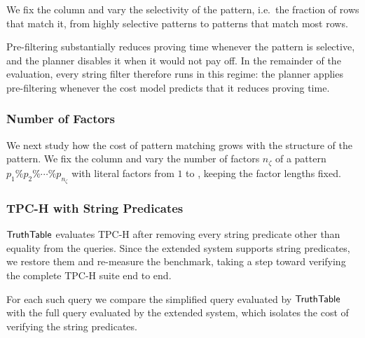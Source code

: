  We fix the column and vary the selectivity of the pattern, i.e.\ the fraction of rows that match it, from highly selective patterns to patterns that match most rows.

 

 Pre-filtering substantially reduces proving time whenever the pattern is selective, and the planner disables it when it would not pay off. In the remainder of the evaluation, every string filter therefore runs in this regime: the planner applies pre-filtering whenever the cost model predicts that it reduces proving time.

\subsubsection{Number of Factors}
\label{sec:eval-factors}

We next study how the cost of pattern matching grows with the structure of the pattern. We fix the column and vary the number of factors $n_\zeta$ of a pattern $p_1\%p_2\%\cdots\%p_{n_\zeta}$ with literal factors from $1$ to , keeping the factor lengths fixed.

\subsubsection{TPC-H with String Predicates}
\label{sec:eval-{TPC-H}}

$\mathsf{TruthTable}$ evaluates TPC-H after removing every string predicate other than equality from the queries. Since the extended system supports string predicates, we restore them and re-measure the benchmark, taking a step toward verifying the complete TPC-H suite end to end.

 For each such query we compare the simplified query evaluated by $\mathsf{TruthTable}$ with the full query evaluated by the extended system, which isolates the cost of verifying the string predicates.
